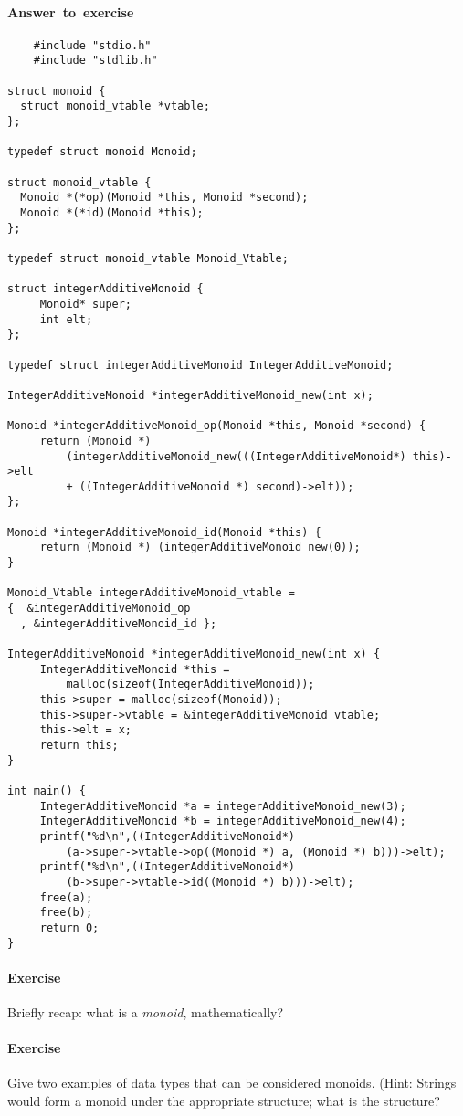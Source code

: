 \documentclass{article}
\newcommand{\percents}[1]{\protect \marginpar[l]{\bf [#1]}}
\newcounter{question}
\newcommand{\question}[1]{
  \addtocounter{question}{1}
  \paragraph{Exercise~\arabic{question}  \percents{#1}}
 }
\newenvironment{ans}{\begin{framed}\paragraph{Answer~to~exercise~\arabic{question}}}{\end{framed}}
\begin{document}
\begin{ans}
  \begin{verbatim}
    #include "stdio.h"
    #include "stdlib.h"

struct monoid {
  struct monoid_vtable *vtable;
};

typedef struct monoid Monoid;

struct monoid_vtable {
  Monoid *(*op)(Monoid *this, Monoid *second);
  Monoid *(*id)(Monoid *this);
};

typedef struct monoid_vtable Monoid_Vtable;

struct integerAdditiveMonoid {
     Monoid* super;
     int elt;
};

typedef struct integerAdditiveMonoid IntegerAdditiveMonoid;

IntegerAdditiveMonoid *integerAdditiveMonoid_new(int x);

Monoid *integerAdditiveMonoid_op(Monoid *this, Monoid *second) {
     return (Monoid *)
         (integerAdditiveMonoid_new(((IntegerAdditiveMonoid*) this)->elt
         + ((IntegerAdditiveMonoid *) second)->elt));
};

Monoid *integerAdditiveMonoid_id(Monoid *this) {
     return (Monoid *) (integerAdditiveMonoid_new(0));
}

Monoid_Vtable integerAdditiveMonoid_vtable =
{  &integerAdditiveMonoid_op
  , &integerAdditiveMonoid_id };

IntegerAdditiveMonoid *integerAdditiveMonoid_new(int x) {
     IntegerAdditiveMonoid *this =
         malloc(sizeof(IntegerAdditiveMonoid));
     this->super = malloc(sizeof(Monoid));
     this->super->vtable = &integerAdditiveMonoid_vtable;
     this->elt = x;
     return this;
}

int main() {
     IntegerAdditiveMonoid *a = integerAdditiveMonoid_new(3);
     IntegerAdditiveMonoid *b = integerAdditiveMonoid_new(4);
     printf("%d\n",((IntegerAdditiveMonoid*)
         (a->super->vtable->op((Monoid *) a, (Monoid *) b)))->elt);
     printf("%d\n",((IntegerAdditiveMonoid*)
         (b->super->vtable->id((Monoid *) b)))->elt);
     free(a);
     free(b);
     return 0;
}

  \end{verbatim}
\end{ans}


\question{-} Briefly recap: what is a \textit{monoid}, mathematically?

\question{-} Give two examples of data types that can be considered monoids.
(Hint: Strings would form a monoid under the appropriate structure; what is the structure?
\end{document}
